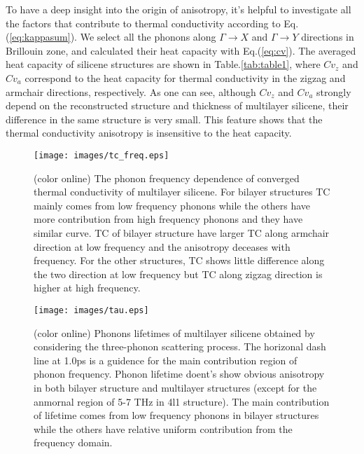 \documentclass[aps,prb,twocolumn,showpacs,amsmath,amssymb]{revtex4-1}
\begin{document}
To have a deep insight into the origin of anisotropy, it's helpful to investigate all the factors that contribute to thermal conductivity according to Eq.(\ref{eq:kappasum}).
We select all the phonons along  $\Gamma\rightarrow X$ and $\Gamma \rightarrow Y$ directions in Brillouin zone, and calculated their heat capacity with Eq.(\ref{eq:cv}). The averaged heat capacity of silicene structures are shown in Table.\ref{tab:table1}, where $Cv_z$ and $Cv_a$ correspond to the  heat capacity for thermal conductivity in the zigzag and armchair directions, respectively.  As one can see, although $Cv_z$ and $Cv_a$  strongly depend on the reconstructed structure and thickness of multilayer silicene, their difference in the same structure is very small. This feature shows that the thermal conductivity anisotropy is insensitive to the heat capacity.


\begin{figure}[b]
  \texttt{[image: images/tc\_freq.eps]}
  \caption{\label{fig:tc_freq} (color online)  The phonon frequency dependence of converged thermal conductivity of multilayer silicene. For bilayer structures TC mainly comes from low frequency phonons while the others have more contribution from high frequency phonons and they have similar curve. TC of bilayer structure have larger TC along armchair direction at low frequency and the anisotropy deceases with frequency. For the other structures, TC shows little difference along the two direction at low frequency but TC along zigzag direction is higher at high frequency. }
\end{figure}

\begin{figure}[b]
  \texttt{[image: images/tau.eps]}
  \caption{\label{fig:tau} (color online)  Phonons lifetimes of multilayer silicene obtained by considering the three-phonon scattering process.  The horizonal dash line at 1.0ps is a guidence for the main contribution region of phonon frequency. Phonon lifetime doent's show obvious anisotropy in both bilayer structure and multilayer structures (except for the anmornal region of 5-7 THz in 4l1 structure). The main contribution of lifetime comes from low frequency phonons in bilayer structures while the others have relative uniform contribution from the frequency domain.  }
\end{figure}
\end{document}

